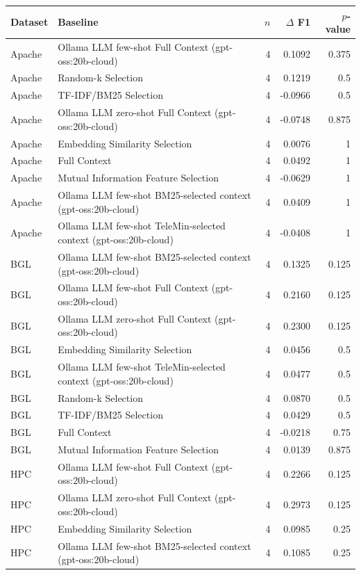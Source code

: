 \begin{tabular}{llrrr}
\toprule
Dataset & Baseline & $n$ & $\Delta$ F1 & $p$-value \\
\midrule
Apache & Ollama LLM few-shot Full Context (gpt-oss:20b-cloud) & 4 & 0.1092 & 0.375 \\
Apache & Random-k Selection & 4 & 0.1219 & 0.5 \\
Apache & TF-IDF/BM25 Selection & 4 & -0.0966 & 0.5 \\
Apache & Ollama LLM zero-shot Full Context (gpt-oss:20b-cloud) & 4 & -0.0748 & 0.875 \\
Apache & Embedding Similarity Selection & 4 & 0.0076 & 1 \\
Apache & Full Context & 4 & 0.0492 & 1 \\
Apache & Mutual Information Feature Selection & 4 & -0.0629 & 1 \\
Apache & Ollama LLM few-shot BM25-selected context (gpt-oss:20b-cloud) & 4 & 0.0409 & 1 \\
Apache & Ollama LLM few-shot TeleMin-selected context (gpt-oss:20b-cloud) & 4 & -0.0408 & 1 \\
BGL & Ollama LLM few-shot BM25-selected context (gpt-oss:20b-cloud) & 4 & 0.1325 & 0.125 \\
BGL & Ollama LLM few-shot Full Context (gpt-oss:20b-cloud) & 4 & 0.2160 & 0.125 \\
BGL & Ollama LLM zero-shot Full Context (gpt-oss:20b-cloud) & 4 & 0.2300 & 0.125 \\
BGL & Embedding Similarity Selection & 4 & 0.0456 & 0.5 \\
BGL & Ollama LLM few-shot TeleMin-selected context (gpt-oss:20b-cloud) & 4 & 0.0477 & 0.5 \\
BGL & Random-k Selection & 4 & 0.0870 & 0.5 \\
BGL & TF-IDF/BM25 Selection & 4 & 0.0429 & 0.5 \\
BGL & Full Context & 4 & -0.0218 & 0.75 \\
BGL & Mutual Information Feature Selection & 4 & 0.0139 & 0.875 \\
HPC & Ollama LLM few-shot Full Context (gpt-oss:20b-cloud) & 4 & 0.2266 & 0.125 \\
HPC & Ollama LLM zero-shot Full Context (gpt-oss:20b-cloud) & 4 & 0.2973 & 0.125 \\
HPC & Embedding Similarity Selection & 4 & 0.0985 & 0.25 \\
HPC & Ollama LLM few-shot BM25-selected context (gpt-oss:20b-cloud) & 4 & 0.1085 & 0.25 \\

\end{tabular}
